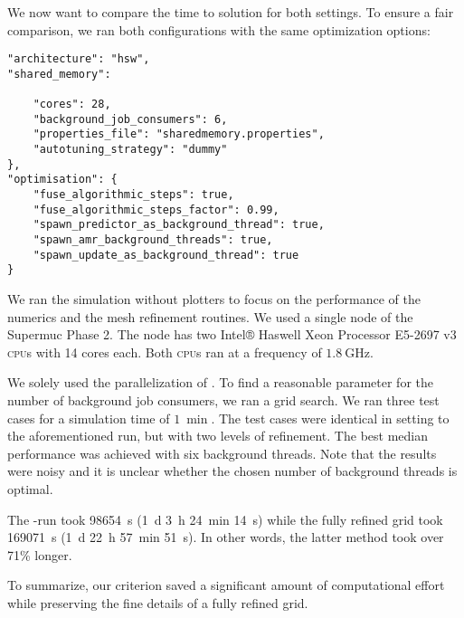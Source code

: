 We now want to compare the time to solution for both settings.
To ensure a fair comparison, we ran both configurations with the same optimization options:
\begin{verbatim}
"architecture": "hsw",
"shared_memory": 

    "cores": 28,
    "background_job_consumers": 6,
    "properties_file": "sharedmemory.properties",
    "autotuning_strategy": "dummy"
},
"optimisation": {
    "fuse_algorithmic_steps": true,
    "fuse_algorithmic_steps_factor": 0.99,
    "spawn_predictor_as_background_thread": true,
    "spawn_amr_background_threads": true,
    "spawn_update_as_background_thread": true
}
\end{verbatim}
We ran the simulation without plotters to focus on the performance of the numerics and the mesh refinement routines.
We used a single node of the Supermuc Phase 2.
The node has two Intel® Haswell Xeon Processor E5-2697 v3 \textsc{cpu}s with 14 cores each.
Both \textsc{cpu}s ran at a frequency of $\SI{1.8}{\GHz}$.

We solely used the \tbb{} parallelization of \exahype{}.
To find a reasonable parameter for the number of background job consumers, we ran a grid search.
We ran three \amr{} test cases for a simulation time of $\SI{1}{\min}$.
The test cases were identical in setting to the aforementioned \amr{} run, but with two levels of refinement.
The best median performance was achieved with six background threads.
Note that the results were noisy and it is unclear whether the chosen number of background threads is optimal.

The \amr{}-run took \SI{98654}{\s} (\SI{1}{\day} \SI{3}{\hour} \SI{24}{\minute} \SI{14}{\s})
while the fully refined grid took \SI{169071}{\s} (\SI{1}{\day} \SI{22}{\hour} \SI{57}{\minute} \SI{51}{\s}).
In other words, the latter method took over 71\% longer.

To summarize, our \amr{} criterion saved a significant amount of computational effort while preserving the fine details of a fully refined grid.

